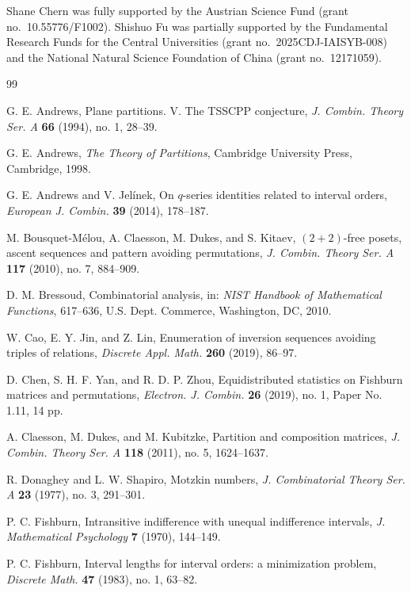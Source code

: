 \documentclass[12pt,reqno]{amsart}
\numberwithin{equation}{section}
\theoremstyle{theorem}
\theoremstyle{definition}
\theoremstyle{named}
\begin{document}
Shane Chern was fully supported by the Austrian Science Fund (grant no.~10.55776/F1002). Shishuo Fu was partially supported by the Fundamental Research Funds for the Central Universities (grant no.~2025CDJ-IAISYB-008) and the National Natural Science Foundation of China (grant no.~12171059).


\begin{thebibliography}{99}
	
	G. E. Andrews, Plane partitions. V. The TSSCPP conjecture, \textit{J. Combin. Theory Ser. A} \textbf{66} (1994), no. 1, 28--39.
	
	G. E. Andrews, \textit{The Theory of Partitions}, Cambridge University Press, Cambridge, 1998.
	
	G. E. Andrews and V. Jel\'inek, On $q$-series identities related to interval orders, \textit{European J. Combin.} \textbf{39} (2014), 178--187.
	
	M. Bousquet-M\'elou, A. Claesson, M. Dukes, and S. Kitaev, $(2+2)$-free posets, ascent sequences and pattern avoiding permutations, \textit{J. Combin. Theory Ser. A} \textbf{117} (2010), no. 7, 884--909.
	
	D. M. Bressoud, Combinatorial analysis, in: \textit{NIST Handbook of Mathematical Functions}, 617--636, U.S. Dept. Commerce, Washington, DC, 2010.
	
	W. Cao, E. Y. Jin, and Z. Lin, Enumeration of inversion sequences avoiding triples of relations, \textit{Discrete Appl. Math.} \textbf{260} (2019), 86--97.
	
	D. Chen, S. H. F. Yan, and R. D. P. Zhou, Equidistributed statistics on Fishburn matrices and permutations, \textit{Electron. J. Combin.} \textbf{26} (2019), no. 1, Paper No. 1.11, 14 pp.
	
	A. Claesson, M. Dukes, and M. Kubitzke, Partition and composition matrices, \textit{J. Combin. Theory Ser. A} \textbf{118} (2011), no. 5, 1624--1637.
	
	R. Donaghey and L. W. Shapiro, Motzkin numbers, \textit{J. Combinatorial Theory Ser. A} \textbf{23} (1977), no. 3, 291--301.
	
	P. C. Fishburn, Intransitive indifference with unequal indifference intervals, \textit{J. Mathematical Psychology} \textbf{7} (1970), 144--149.
	
	P. C. Fishburn, Interval lengths for interval orders: a minimization problem, \textit{Discrete Math.} \textbf{47} (1983), no. 1, 63--82.
	

\end{thebibliography}
\end{document}
